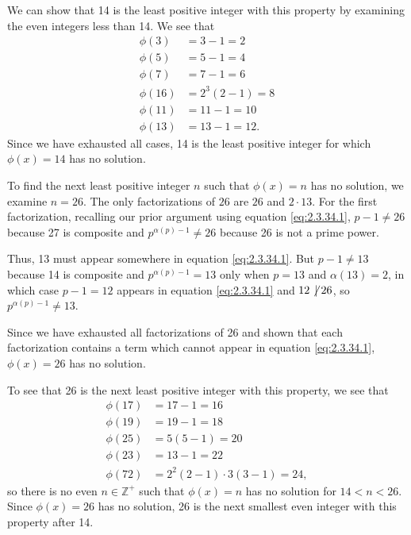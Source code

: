 \documentclass[12 pt]{amsart}
\begin{document}
  We can show that 14 is the least positive integer with this property by 
  examining the even integers less than 14. 
  We see that
  \begin{align*}
    \phi(3) &= 3 - 1 = 2 \\
    \phi(5) &= 5 - 1 = 4 \\
    \phi(7) &= 7 - 1 = 6 \\
    \phi(16) &= 2^3 (2-1) = 8 \\
    \phi(11) &= 11 - 1 = 10 \\
    \phi(13) &= 13 - 1 = 12.
  \end{align*}
  Since we have exhausted all cases, 14 is the least positive integer
  for which $\phi(x) = 14$ has no solution.

  To find the next least positive integer $n$ such that 
  $\phi(x) = n$ has no solution, we examine $n = 26$.
  The only factorizations of $26$ are $26$ and $2 \cdot 13$.
  For the first factorization, recalling our prior argument using
  equation \ref{eq:2.3.34.1}, $p - 1 \neq 26$ because 27 is composite 
  and $p^{\alpha(p) - 1} \neq 26$ because 26 is not a prime power. 

  Thus, 13 must appear somewhere in equation \ref{eq:2.3.34.1}.
  But $p - 1 \neq 13$ because 14 is composite and 
  $p^{\alpha(p) - 1} = 13$ only when $p = 13$ and $\alpha(13) = 2$,
  in which case $p - 1 = 12$ appears in equation \ref{eq:2.3.34.1}
  and $12 \not \, \mid 26$, so $p^{\alpha(p)-1} \neq 13$.
  
  Since we have exhausted all factorizations of 26 and shown that each 
  factorization
  contains a term which cannot appear in equation \ref{eq:2.3.34.1}, 
  $\phi(x) = 26$ has no solution. 
  
  To see that 26 is the next least positive integer with this property,
  we see that
  \begin{align*}
    \phi(17) &= 17 - 1 = 16 \\
    \phi(19) &= 19 - 1 = 18 \\
    \phi(25) &= 5(5-1) = 20 \\
    \phi(23) &= 13 - 1 = 22 \\
    \phi(72) &= 2^2(2-1)\cdot 3(3-1)= 24,
  \end{align*}
  so there is no even $n \in \mathbb{Z}^+$ such that 
  $\phi(x) = n$ has no solution for $14 < n < 26$.
  Since $\phi(x) = 26$ has no solution, 26 is the next
  smallest even integer with this property after 14.
\vfill
\newpage
\end{document}

